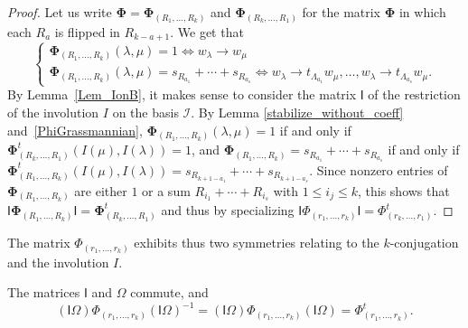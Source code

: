 \documentclass[ALCO,ThmDefs,Unicode,epreuves]{cedram}
\begin{document}
\begin{proof}
Let us write $\boldsymbol{\Phi=\Phi}_{(R_{1},\ldots,R_{k})}$ and
$\boldsymbol{\Phi}_{(R_{k},\ldots,R_{1})}$ for the matrix $\boldsymbol{\Phi}$
in which each $R_{a}$ is flipped in $R_{k-a+1}$. We get that
\begin{equation}
\left\{
\begin{matrix}
\boldsymbol{\Phi}_{(R_{1},\ldots,R_{k})}(\lambda,\mu)=1\Longleftrightarrow
w_{\lambda}\rightarrow w_{\mu}\\
\boldsymbol{\Phi}_{(R_{1},\ldots,R_{k})}(\lambda,\mu)=s_{R_{a_{1}}}%
+\cdots+s_{R_{a_{s}}}\Longleftrightarrow w_{\lambda}\rightarrow t_{\Lambda
_{a_{1}}}w_{\mu},\ldots,w_{\lambda}\rightarrow t_{\Lambda_{a_{s}}}w_{\mu}.
\end{matrix}
\right. \label{PhiGrassmannian}%
\end{equation}
By Lemma~\ref{Lem_IonB}, it makes sense to consider the matrix $\mathsf{I}$ of
the restriction of the involution $I$ on the basis $\mathcal{I}$. By Lemma
\ref{stabilize_without_coeff} and~\eqref{PhiGrassmannian}, $\boldsymbol{\Phi
}_{(R_{1},\ldots,R_{k})}(\lambda,\mu)=1$ if and only if $\boldsymbol{\Phi
}_{(R_{k},\ldots,R_{1})}^{t}(I(\mu),I(\lambda))=1$, and $\boldsymbol{\Phi
}_{(R_{1},\ldots,R_{k})}=s_{R_{a_{1}}}+\cdots+s_{R_{a_{s}}}$ if and only if
$\boldsymbol{\Phi}_{(R_{1},\ldots,R_{k})}^{t}(I(\mu),I(\lambda
))=s_{R_{k+1-a_{1}}}+\cdots+s_{R_{k+1-a_{s}}}$. Since nonzero entries of
$\boldsymbol{\Phi}_{(R_{1},\ldots,R_{k})}$ are either $1$ or a sum $R_{i_{1}%
}+\cdots+R_{i_{s}}$ with $1\leq i_{j}\leq k$, this shows that $\mathsf{I}%
\boldsymbol{\Phi}_{(R_{1},\ldots,R_{k})}\mathsf{I}=\boldsymbol{\Phi}%
_{(R_{k},\ldots,R_{1})}^{t}$ and thus by specializing $\mathsf{I}\Phi
_{(r_{1},\ldots,r_{k})}\mathsf{I}=\Phi_{(r_{k},\ldots,r_{1})}^{t}.$
\end{proof}

The matrix $\Phi_{(r_{1},\ldots,r_{k})}$ exhibits thus two symmetries relating
to the $k$-conjugation and the involution $I$.

\begin{prop}
\label{good_Symmetry} The matrices $\mathsf{I}$ and $\Omega$ commute, and
\[
(\mathsf{I}\Omega)\Phi_{(r_{1},\ldots,r_{k})}(\mathsf{I}\Omega)^{-1}%
=(\mathsf{I}\Omega)\Phi_{(r_{1},\ldots,r_{k})}(\mathsf{I}\Omega)=\Phi
_{(r_{1},\ldots,r_{k})}^{t}.
\]

\end{prop}
\end{document}
